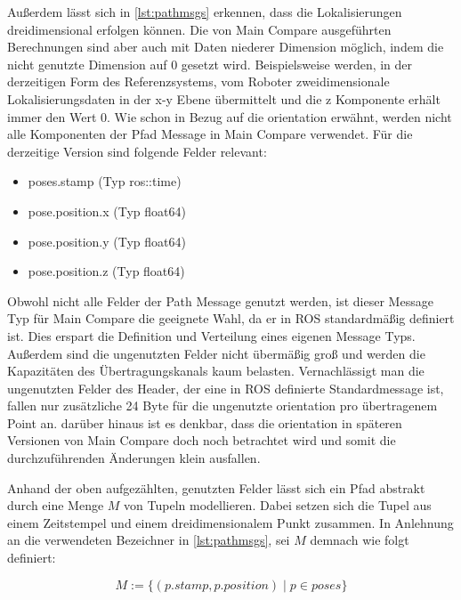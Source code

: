Außerdem lässt sich in \autoref{lst:pathmsgs} erkennen, dass die
Lokalisierungen dreidimensional erfolgen können. Die von Main Compare
ausgeführten Berechnungen sind aber auch mit Daten niederer Dimension möglich,
indem die nicht genutzte Dimension auf 0 gesetzt wird. Beispielsweise werden,
in der derzeitigen Form des Referenzsystems, vom Roboter zweidimensionale
Lokalisierungsdaten in der x-y Ebene übermittelt und die z Komponente erhält
immer den Wert 0. Wie schon in Bezug auf die orientation erwähnt, werden nicht alle Komponenten der
Pfad Message in Main Compare verwendet. Für die derzeitige Version sind
folgende Felder relevant:

\begin{itemize}
  \item poses.stamp (Typ ros::time)
  \item pose.position.x (Typ float64)
  \item pose.position.y (Typ float64)
  \item pose.position.z (Typ float64)
\end{itemize}

Obwohl nicht alle Felder der Path Message genutzt werden, ist dieser Message Typ
für Main Compare die geeignete Wahl, da er in ROS standardmäßig
definiert ist. Dies erspart die Definition und Verteilung eines
eigenen Message Typs. Außerdem sind die ungenutzten Felder nicht
übermäßig groß und werden die Kapazitäten des Übertragungskanals kaum belasten.
Vernachlässigt man die ungenutzten Felder des Header, der eine in ROS definierte Standardmessage ist, fallen nur
zusätzliche 24 Byte für die ungenutzte orientation pro übertragenem Point an.
darüber hinaus ist es denkbar, dass die orientation in späteren Versionen von
Main Compare doch noch betrachtet wird und somit die durchzuführenden
Änderungen klein ausfallen.

Anhand der oben aufgezählten, genutzten Felder lässt sich ein Pfad abstrakt durch eine Menge
$M$ von Tupeln modellieren. Dabei setzen sich die Tupel aus einem Zeitstempel und einem dreidimensionalem
Punkt zusammen. In Anlehnung an die verwendeten Bezeichner in
\autoref{lst:pathmsgs}, sei $M$ demnach wie folgt definiert:

\begin{equation*}
  \label{eqn:setdef}
  M := \{ (p.stamp , p.position) \mid p \in poses \}
\end{equation*}

